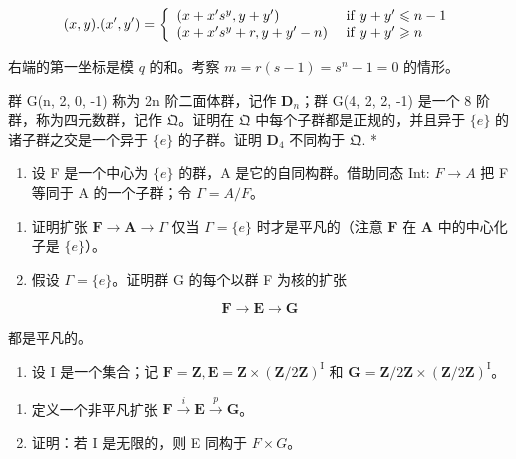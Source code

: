 \[
(x, y). (x ^ {\prime}, y ^ {\prime}) = \left\{ \begin{array}{l l} (x + x ^ {\prime} s ^ {y}, y + y ^ {\prime}) & \text { if } y + y ^ {\prime} \leqslant n - 1 \\ (x + x ^ {\prime} s ^ {y} + r, y + y ^ {\prime} - n) & \text { if } y + y ^ {\prime} \geqslant n \end{array} \right.
\]

右端的第一坐标是模 \(q\) 的和。考察 \(m = r(s - 1) = s^n - 1 = 0\) 的情形。

群 G(n, 2, 0, -1) 称为 2n 阶二面体群，记作 \(\mathbf{D}_{n}\)；群 G(4, 2, 2, -1) 是一个 8 阶群，称为四元数群，记作 \(\mathfrak{Q}\)。证明在 \(\mathfrak{Q}\) 中每个子群都是正规的，并且异于 \(\{e\}\) 的诸子群之交是一个异于 \(\{e\}\) 的子群。证明 \(\mathbf{D}_{4}\) 不同构于 \(\mathfrak{Q}.\) *

\begin{enumerate}
\def\labelenumi{\arabic{enumi}。}
\setcounter{enumi}{4}
\tightlist
\item
  设 F 是一个中心为 \(\{e\}\) 的群，A 是它的自同构群。借助同态 Int: \(F \rightarrow A\) 把 F 等同于 A 的一个子群；令 \(\Gamma = A/F\)。
\end{enumerate}

\begin{enumerate}
\def\labelenumi{(\alph{enumi})}
\item
  证明扩张 \(\mathbf{F} \to \mathbf{A} \to \Gamma\) 仅当 \(\Gamma = \{e\}\) 时才是平凡的（注意 \(\mathbf{F}\) 在 \(\mathbf{A}\) 中的中心化子是 \(\{e\}\)）。
\item
  假设 \(\Gamma = \{e\}\)。证明群 G 的每个以群 F 为核的扩张
\end{enumerate}

\[
\mathbf {F} \rightarrow \mathbf {E} \rightarrow \mathbf {G}
\]

都是平凡的。

\begin{enumerate}
\def\labelenumi{\arabic{enumi}。}
\setcounter{enumi}{5}
\tightlist
\item
  设 I 是一个集合；记 \(\mathbf{F} = \mathbf{Z}, \mathbf{E} = \mathbf{Z} \times (\mathbf{Z}/2\mathbf{Z})^{\mathrm{I}}\) 和 \(\mathbf{G} = \mathbf{Z}/2\mathbf{Z} \times (\mathbf{Z}/2\mathbf{Z})^{\mathrm{I}}\)。
\end{enumerate}

\begin{enumerate}
\def\labelenumi{(\alph{enumi})}
\item
  定义一个非平凡扩张 \(\mathbf{F} \xrightarrow{i} \mathbf{E} \xrightarrow{p} \mathbf{G}\)。
\item
  证明：若 I 是无限的，则 E 同构于 \(F \times G\)。
\end{enumerate}

